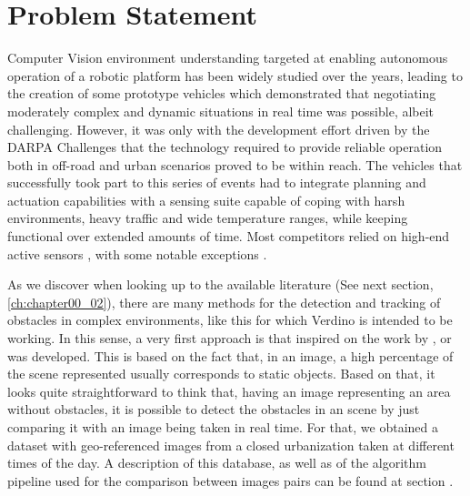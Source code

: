 
\graphicspath{{./images/chapter00/bmps/}{./images/chapter00/vects/}{./images/chapter00/}}

\label{ch:chapter00}

\section{Problem Statement}\label{ch:chapter00_01}

Computer Vision environment understanding targeted at enabling autonomous operation of a robotic platform has been widely studied over the years, leading to the creation of some prototype vehicles \cite{Maurer1996,Pomerleau1996,Broggi1999} which demonstrated that negotiating moderately complex and dynamic situations in real time was possible, albeit challenging. However, it was only with the development effort driven by the DARPA Challenges \cite{Buehler2007, Buehler2009} that the technology required to provide reliable operation both in off-road and urban scenarios proved to be within reach.
The vehicles that successfully took part to this series of events had to integrate planning and actuation capabilities with a sensing suite capable of coping with harsh environments, heavy traffic and wide temperature ranges, while keeping functional over extended amounts of time. Most competitors relied on high-end active sensors \cite{Urmson2008, Montemerlo2008, Bacha2008, Kammel2008}, with some notable exceptions \cite{Broggi2006, Broggi2010}. 

As we discover when looking up to the available literature (See next section, \ref{ch:chapter00_02}), there are many methods for the detection and tracking of obstacles in complex environments, like this for which Verdino is intended to be working. In this sense, a very first approach is that inspired on the work by \cite{primdahl2005change},  \cite{diego2011video} or \cite{vallespi2012prior} was developed. This is based on the fact that, in an image, a high percentage of the scene represented usually corresponds to static objects. Based on that, it looks quite straightforward to think that, having an image representing an area without obstacles, it is possible to detect the obstacles in an scene by just comparing it with an image being taken in real time. For that, we obtained a dataset with geo-referenced images from a closed urbanization taken at different times of the day. A description of this database, as well as of the algorithm pipeline used for the comparison between images pairs can be found at section \todo{ \ref{XXX} }.

